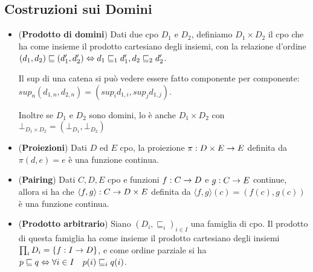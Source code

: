 \documentclass[a4paper,NoNotes,GeneralMath]{stdmdoc}
\newcommand{\sle}{\sqsubseteq}
\begin{document}
\subsection*{Costruzioni sui Domini}
\begin{itemize}
\item ({\bf Prodotto di domini}) Dati due cpo $D_1$ e $D_2$, definiamo $D_1 \times D_2$ il cpo che ha come insieme il prodotto cartesiano degli insiemi, con la relazione d'ordine $(d_1, d_2) \sle (d_1', d_2') \sse d_1 \sle_1 d_1', d_2 \sle_2 d_2'$.

  Il sup di una catena si può vedere essere fatto componente per componente: $sup_n (d_{1,n}, d_{2,n}) = (sup_i d_{1,i}, sup_j d_{1,j})$.

  Inoltre se $D_1$ e $D_2$ sono domini, lo è anche $D_1 \times D_2$ con $\bot_{D_1 \times D_2} = (\bot_{D_1}, \bot_{D_2})$
\item ({\bf Proiezioni}) Dati $D$ ed $E$ cpo, la proiezione $\pi: D \times E \rightarrow E$ definita da $\pi(d, e) = e$ è una funzione continua.
\item ({\bf Pairing}) Dati $C, D, E$ cpo e funzioni $f: C \rightarrow D$ e $g: C \rightarrow E$ continue, allora si ha che $\langle f, g \rangle : C \rightarrow D \times E$ definita da $\langle f, g \rangle (c) = (f(c), g(c))$ è una funzione continua.
\item ({\bf Prodotto arbitrario}) Siano $(D_i, \sle_i)_{i \in I}$ una famiglia di cpo. Il prodotto di questa famiglia ha come insieme il prodotto cartesiano degli insiemi $\prod_i D_i = \{ f: I \rightarrow D\}$, e come ordine parziale si ha $p \sle q \sse \forall i \in I \quad p(i) \sle_i q(i)$.
\end{itemize}
\end{document}
